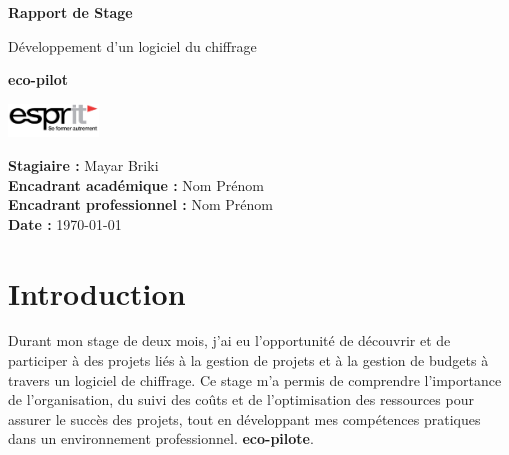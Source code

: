 \documentclass[12pt,a4paper]{report}
\begin{document}
\begin{titlepage}
    \centering
    {\Huge \textbf{Rapport de Stage} \par}
    \vspace{1.5cm}
    {\LARGE Développement d’un logiciel du chiffrage\par}
    \vspace{0.5cm}
    {\Large \textbf{eco-pilot} \par}
    \vspace{1cm}
    \includegraphics[width=0.18\textwidth]{Logo_ESPRIT_Ariana.jpg}
    \vspace{2cm}
    \vfill
    \begin{flushright}
        \textbf{Stagiaire :} Mayar Briki \\
        \textbf{Encadrant académique :} Nom Prénom \\
        \textbf{Encadrant professionnel :} Nom Prénom \\
        \textbf{Date :} \today
    \end{flushright}
\end{titlepage}


\chapter{Introduction}
Durant mon stage de deux mois, j’ai eu l’opportunité de découvrir et de participer à des projets liés à la gestion de projets et à la gestion de budgets à travers un logiciel de chiffrage. Ce stage m’a permis de comprendre l’importance de l’organisation, du suivi des coûts et de l’optimisation des ressources pour assurer le succès des projets, tout en développant mes compétences pratiques dans un environnement professionnel. \textbf{eco-pilote}.  

\end{document}
